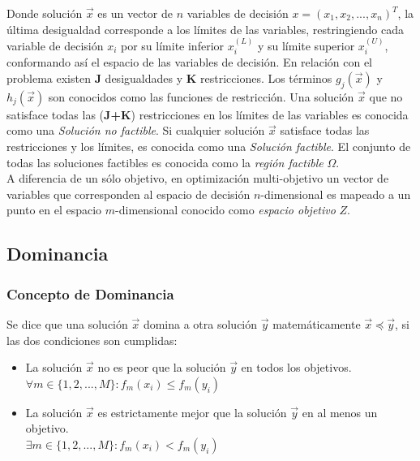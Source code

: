 Donde solución $\vec{x}$ es un vector de $n$ variables de decisión $x = (x_1, x_2, ..., x_n)^T$, la última desigualdad corresponde a los límites de las variables, restringiendo cada variable de decisión $x_i$ por su límite inferior $x_i^{(L)}$ y su límite superior $x_i^{(U)}$, conformando así el espacio de las variables de decisión. 
%
En relación con el problema existen $\textbf{J}$ desigualdades y $\textbf{K}$ restricciones.
%
Los términos $g_j(\vec{x})$ y $h_j(\vec{x})$ son conocidos como las funciones de restricción.
%
Una solución $\vec{x}$ que no satisface todas las (\textbf{J+K}) restricciones en los límites de las variables es conocida como una \textit{Solución no factible}. 
%
Si cualquier solución $\vec{x}$ satisface todas las restricciones y los límites, es conocida como una \textit{Solución factible}.
%
El conjunto de todas las soluciones factibles es conocida como la \textit{región factible} $\Omega$.\\
A diferencia de un sólo objetivo, en optimización multi-objetivo un vector de variables que corresponden al espacio de decisión $n$-dimensional es mapeado a un punto en el espacio $m$-dimensional conocido como \textit{espacio objetivo} $Z$.
\subsection{Dominancia}

\subsubsection*{Concepto de Dominancia}
Se dice que una solución $\vec{x}$ domina a otra solución $\vec{y}$ matemáticamente $\vec{x} \preceq \vec{y}$, si las dos condiciones son cumplidas:
\begin{itemize}
\item La solución $\vec{x}$ no es peor que la solución $\vec{y}$ en todos los objetivos.\\
$\forall m \in \{ 1, 2, ..., M \}: f_m(x_i) \leq f_m(y_i)$
\item La solución $\vec{x}$ es estrictamente mejor que la solución $\vec{y}$ en al menos un objetivo.\\
$\exists m \in \{ 1, 2, ..., M \}: f_m(x_i) < f_m(y_i)$
\end{itemize}
